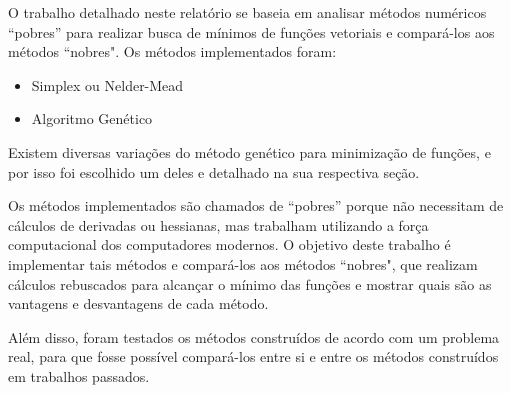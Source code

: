 O trabalho detalhado neste relatório se baseia em analisar métodos numéricos ``pobres'' para realizar busca de mínimos de funções vetoriais e compará-los aos métodos ``nobres". Os métodos implementados foram:

\begin{itemize}
	\item Simplex ou Nelder-Mead
	\item Algoritmo Genético
\end{itemize}

Existem diversas variações do método genético para minimização de funções, e por isso foi escolhido um deles e detalhado na sua respectiva seção. 

Os métodos implementados são chamados de ``pobres'' porque não necessitam de cálculos de derivadas ou hessianas, mas trabalham utilizando a força computacional dos computadores modernos. O objetivo deste trabalho é implementar tais métodos e compará-los aos métodos ``nobres", que realizam cálculos rebuscados para alcançar o mínimo das funções e mostrar quais são as vantagens e desvantagens de cada método.

Além disso, foram testados os métodos construídos de acordo com um problema real, para que fosse possível compará-los entre si e entre os métodos construídos em trabalhos passados.
